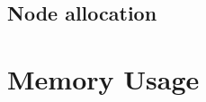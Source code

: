 \documentclass[10pt,aspectratio=169]{beamer}
\def\dgfile{\node[style=dgfile]}
\def\nodeU{\node[style=nodeU]}
\def\nodeD{\node[style=nodeD]}
\def\nodeQ{\node[style=nodeQ]}
\def\nodeO{\node[style=nodeO]}
\def\valueU{\node[style=valueU]}
\def\valueD{\node[style=valueD]}
\def\valueQ{\node[style=valueQ]}
\def\valueO{\node[style=valueO]}
\begin{document}
\subsection[Node allocation]{Node allocation}
%
%
%

\section[Memory Usage]{Memory Usage}

%
%
%
%
%
%
\end{document}
